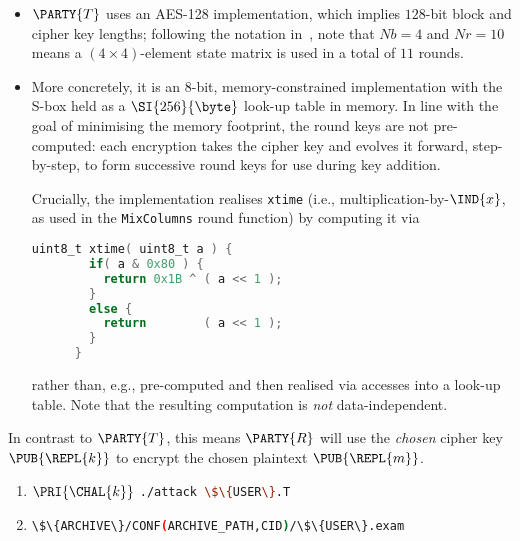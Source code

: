 \begin{itemize}
\item $\PARTY{T}$ 
      uses an AES-128 implementation, which implies $128$-bit block and 
      cipher key lengths;
      following the notation in~\cite[Figure 5]{SCALE:FIPS:197:01}, note
      that 
      $
      Nb =  4
      $ 
      and 
      $
      Nr = 10
      $ 
      means a $( 4 \times 4 )$-element state matrix is used in a total of 
      $11$ rounds.
\item More concretely, it is an $8$-bit, memory-constrained implementation
      with the S-box held as a $\SI{256}{\byte}$ look-up table in memory. 
      In line with the goal of minimising the memory footprint, the round
      keys are not pre-computed: each encryption takes the cipher key and
      evolves it forward, step-by-step, to form successive round keys for
      use during key addition.  

      Crucially, the implementation realises 
      \lstinline[language={C}]|xtime| (i.e., multiplication-by-$\IND{x}$,
      as used in the \lstinline{MixColumns} round function) by computing
      it via

      \begin{lstlisting}[language={C},gobble={6},frame={single},basicstyle={\ttfamily\small}]
      uint8_t xtime( uint8_t a ) {
        if( a & 0x80 ) {
          return 0x1B ^ ( a << 1 );
        }
        else {
          return        ( a << 1 );
        }
      }
      \end{lstlisting}

      \noindent
      rather than, e.g., pre-computed and then realised via accesses into 
      a look-up table.  Note that the resulting computation is {\em not} 
      data-independent.
\end{itemize}


%
In contrast to 
$\PARTY{T}$, 
this means 
$\PARTY{R}$ 
will use the
{\em chosen} cipher key $\PUB{\REPL{k}}$ 
to encrypt the
     chosen  plaintext  $\PUB{\REPL{m}}$.



\begin{enumerate}
\item \DESCTASKIMPL
      {$\PRI{\CHAL{k}}$}
      {\mbox{\lstinline[language={bash}]|./attack \$\{USER\}.T|}}
\item \DESCTASKEXAM
      {\mbox{\lstinline[language={bash}]|\$\{ARCHIVE\}/CONF(ARCHIVE_PATH,CID)/\$\{USER\}.exam|}}
\end{enumerate}

